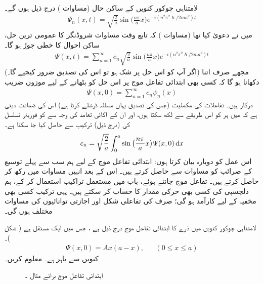  لامتناہی چوکور کنویں کے ساکن حال (مساوات ) درج ذیل ہوں گے۔ 
 \begin{align}
\Psi_{n}(x,t)=\sqrt{\frac{2}{a}}\sin\big(\frac{n\pi}{a}x\big)e^{-i(n^{2}\pi^{2}\hslash/2ma^{2})t}
\end{align}
 میں نے دعویٰ کیا تھا  (مساوات )  کہ تابع وقت مساوات شروڈنگر کا عمومی ترین حل، ساکن احوال کا خطی جوڑ ہو گا۔
\begin{align}\label{مساوات_شروڈنگر_ساکن_حالات_کا_مجموعہ}
\Psi(x,t)=\sum_{n=1}^{\infty}c_n\sqrt{\frac{2}{a}}\sin\big(\frac{n\pi}{a}x\big)e^{-i(n^{2}\pi^{2}\hslash/2ma^{2})t}
\end{align} 
 (اگر آپ کو اس حل پر شک ہو تو اس کی تصدیق ضرور کیجیے گا۔) مجھے صرف اتنا دکھانا ہو گا کہ کسی بھی ابتدائی تفاعل موج  پر اس حل کو بٹھانے کے لیے موزوں  ضریب  
\begin{align*}
\Psi(x,0)=\sum_{n=1}^{\infty}c_{n}\psi_{n}(x)
\end{align*}
 درکار ہیں۔ تفاعلات  کی مکملیت (جس کی تصدیق یہاں مسئلہ ڈرشلے کرتا ہے) اس کی ضمانت دیتی ہے کہ میں ہر  کو   اس طریقے سے لکھ سکتا ہوں، اور ان کے اکائی تعامد کی وجہ سے  کو فوریئر تسلسل  کی  (درج ذیل) ترکیب سے حاصل کیا جا سکتا ہے۔
\begin{align}\label{مساوات_شروڈنگر_عددی_سروں}
c_{n}=\sqrt{\frac{2}{a}}\int_{0}^{a}\sin\big(\frac{n\pi}{a}x\big)\Psi(x,0)\dif{x}
\end{align}
 اس عمل کو دوبارہ بیان کرتا ہوں: ابتدائی تفاعل موج  کے لیے ہم سب سے پہلے توسیع کے  ضرائب   کو مساوات  سے حاصل کرتے ہیں۔ اس کے بعد انہیں مساوات  میں رکھ کر  حاصل کرتے ہیں۔ تفاعل موج  جانتے ہوئے،  باب  میں مستعمل تراکیب استعمال کر کے،  ہم دلچسپی کی کسی بھی حرکی مقدار کا حساب کر سکتے ہیں۔ یہی ترکیب کسی بھی مخفیہ کے لیے کارآمد ہو گی؛ صرف  کی تفاعلی شکل اور اجازتی توانائیوں کی مساوات مختلف ہوں گی۔

لامتناہی چوکور کنویں میں  ذرے کا ابتدائی تفاعل موج درج ذیل ہے ،  جس میں  ایک مستقل ہے ( شکل )۔
\begin{align*}
\Psi(x,0)=Ax(a-x),&& (0\le x\le a)
\end{align*}
 کنویں سے باہر  ہے۔  معلوم کریں۔ 
 \begin{figure}
\centering
{}
\caption{ابتدائی تفاعل موج برائے مثال ۔}
\label{شکل_غیر_تابع_ابتدائی_تفاعل_موج}
\end{figure}

